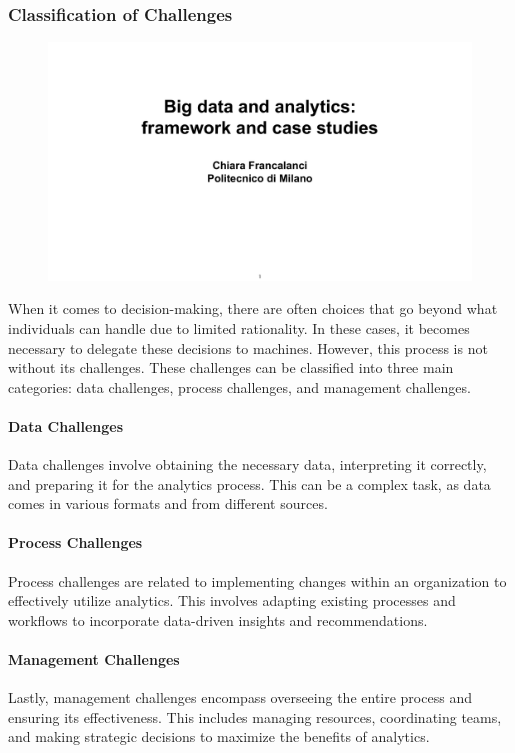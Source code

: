 \subsubsection{Classification of Challenges}

\begin{figure}[!h]
  \centering
  \includegraphics[page=39, trim = 0.3cm 2.5cm 1cm 4cm, clip, width=\imagewidth]{images/06 - BIG_DATA.pdf}
\end{figure}

When it comes to decision-making, there are often choices that go beyond
what individuals can handle due to limited rationality. In these cases,
it becomes necessary to delegate these decisions to machines. However,
this process is not without its challenges. These challenges can be
classified into three main categories: data challenges, process
challenges, and management challenges.

\paragraph{Data Challenges}
Data challenges involve obtaining the necessary data, interpreting it
correctly, and preparing it for the analytics process. This can be a
complex task, as data comes in various formats and from different
sources.

\paragraph{Process Challenges}
Process challenges are related to implementing changes within an
organization to effectively utilize analytics. This involves adapting
existing processes and workflows to incorporate data-driven insights and
recommendations.

\paragraph{Management Challenges}
Lastly, management challenges encompass overseeing the entire process
and ensuring its effectiveness. This includes managing resources,
coordinating teams, and making strategic decisions to maximize the
benefits of analytics.

